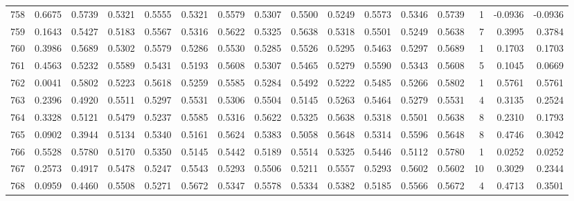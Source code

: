\begin{tabular}{lrrrrrrrrrrrrrrr}
758 &      0.6675 &  0.5739 &  0.5321 &  0.5555 &  0.5321 &  0.5579 &  0.5307 &  0.5500 &  0.5249 &  0.5573 &   0.5346 &     0.5739 &      1 &                   -0.0936 &                    -0.0936 \\
759 &      0.1643 &  0.5427 &  0.5183 &  0.5567 &  0.5316 &  0.5622 &  0.5325 &  0.5638 &  0.5318 &  0.5501 &   0.5249 &     0.5638 &      7 &                    0.3995 &                     0.3784 \\
760 &      0.3986 &  0.5689 &  0.5302 &  0.5579 &  0.5286 &  0.5530 &  0.5285 &  0.5526 &  0.5295 &  0.5463 &   0.5297 &     0.5689 &      1 &                    0.1703 &                     0.1703 \\
761 &      0.4563 &  0.5232 &  0.5589 &  0.5431 &  0.5193 &  0.5608 &  0.5307 &  0.5465 &  0.5279 &  0.5590 &   0.5343 &     0.5608 &      5 &                    0.1045 &                     0.0669 \\
762 &      0.0041 &  0.5802 &  0.5223 &  0.5618 &  0.5259 &  0.5585 &  0.5284 &  0.5492 &  0.5222 &  0.5485 &   0.5266 &     0.5802 &      1 &                    0.5761 &                     0.5761 \\
763 &      0.2396 &  0.4920 &  0.5511 &  0.5297 &  0.5531 &  0.5306 &  0.5504 &  0.5145 &  0.5263 &  0.5464 &   0.5279 &     0.5531 &      4 &                    0.3135 &                     0.2524 \\
764 &      0.3328 &  0.5121 &  0.5479 &  0.5237 &  0.5585 &  0.5316 &  0.5622 &  0.5325 &  0.5638 &  0.5318 &   0.5501 &     0.5638 &      8 &                    0.2310 &                     0.1793 \\
765 &      0.0902 &  0.3944 &  0.5134 &  0.5340 &  0.5161 &  0.5624 &  0.5383 &  0.5058 &  0.5648 &  0.5314 &   0.5596 &     0.5648 &      8 &                    0.4746 &                     0.3042 \\
766 &      0.5528 &  0.5780 &  0.5170 &  0.5350 &  0.5145 &  0.5442 &  0.5189 &  0.5514 &  0.5325 &  0.5446 &   0.5112 &     0.5780 &      1 &                    0.0252 &                     0.0252 \\
767 &      0.2573 &  0.4917 &  0.5478 &  0.5247 &  0.5543 &  0.5293 &  0.5506 &  0.5211 &  0.5557 &  0.5293 &   0.5602 &     0.5602 &     10 &                    0.3029 &                     0.2344 \\
768 &      0.0959 &  0.4460 &  0.5508 &  0.5271 &  0.5672 &  0.5347 &  0.5578 &  0.5334 &  0.5382 &  0.5185 &   0.5566 &     0.5672 &      4 &                    0.4713 &                     0.3501 \\

\end{tabular}
